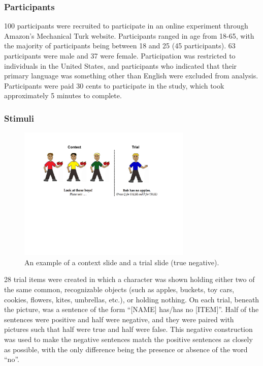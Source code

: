 \documentclass[10pt,letterpaper]{article}
\begin{document}
\subsubsection{Participants}
100 participants were recruited to participate in an online experiment through Amazon's Mechanical Turk website.  Participants ranged in age from 18-65, with the majority of participants being between 18 and 25 (45 participants).  63 participants were male and 37 were female.  Participation was restricted to individuals in the United States, and participants who indicated that their primary language was something other than English were excluded from analysis.  Participants were paid 30 cents to participate in the study, which took approximately 5 minutes to complete.  

\subsubsection{Stimuli}

\begin{figure}[t]
\begin{center} 
\includegraphics[width=3.25in]{figures/negatron_trialfig2.pdf}
\caption{\label{fig:addition_subs} An example of a context slide and a trial slide (true negative). }
\vspace{-5mm}
\end{center} 
\end{figure}

28 trial items were created in which a character was shown holding either two of the same common, recognizable objects (such as apples, buckets, toy cars, cookies, flowers, kites, umbrellas, etc.), or holding nothing.  On each trial, beneath the picture, was a sentence of the form ``[NAME] has/has no [ITEM]''.  Half of the sentences were positive and half were negative, and they were paired with pictures such that half were true and half were false.  This negative construction was used to make the negative sentences match the positive sentences as closely as possible, with the only difference being the presence or absence of the word ``no''.  
\end{document}
